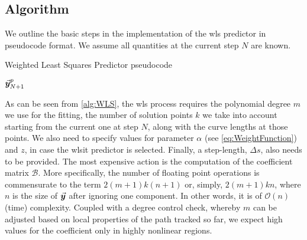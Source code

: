 \subsection{Algorithm}\label{CH5-S3SS1}
We outline the basic steps in the implementation of the \acrshort{wls}
predictor in pseudocode format. We assume all quantities at the current step
$N$ are known.

\begin{algorithm}[t]
	\caption{Weighted Least Squares Predictor pseudocode}
	\label{alg:WLS}
	\begin{algorithmic}
		\ENDFOR
		\STATE{}
		\STATE{}
		\STATE{}
		\RETURN $\vec{\bm{y}}^p_{N+1}$
	\end{algorithmic}
\end{algorithm}

As can be seen from \ref{alg:WLS}, the \acrshort{wls} process requires the 
polynomial degree  $m$ we use for the fitting, the number of solution 
points $k$ we take into account starting from the current one at step $N$, 
along with the curve lengths at those points. We also need to specify values for
parameter $\alpha$ (see \ref{eq:WeightFunction}) and $z$, in case the 
\acrshort{wlsit}
predictor is selected. Finally, a step-length, $\Delta s$, also needs to be
provided. The most expensive action is the computation of the coefficient matrix
$\bm{\mathcal{B}}$. More specifically, the number of floating point operations 
is
commensurate to the term $2(m+1)k(n+1)$ or, simply, $2(m+1)kn$, where $n$ is
the size of $\vec{\bm{y}}$ after ignoring one component. In other words, it
is of $\mathcal{O}(n)$ (time) complexity. Coupled with a degree control check, 
whereby
$m$ can be adjusted based on local properties of the path tracked so far, we 
expect high values for the coefficient only in highly nonlinear regions. 

